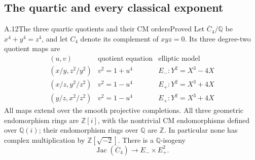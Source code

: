 \subsection{The quartic and every classical exponent}

\begin{statement}{A.12}{The three quartic quotients and their CM orders}{Proved}
Let $\overline C_4/\mathbb Q$ be $x^4+y^4=z^4$, and let $C_4$ denote
its complement of $xyz=0$. Its three degree-two quotient maps are
\[
 \begin{array}{c|c|c}
 (u,v)&\text{quotient equation}&\text{elliptic model}\\\hline
 (x/y,z^2/y^2)&v^2=1+u^4&E_-:Y^2=X^3-4X\\
 (x/z,y^2/z^2)&v^2=1-u^4&E_+:Y^2=X^3+4X\\
 (y/z,x^2/z^2)&v^2=1-u^4&E_+:Y^2=X^3+4X
 \end{array}
\]
All maps extend over the smooth projective completions. All three
geometric endomorphism rings are $\mathbb Z[i]$, with the nontrivial CM
endomorphisms defined over $\mathbb Q(i)$; their endomorphism rings over
$\mathbb Q$ are $\mathbb Z$. In particular none has complex
multiplication by $\mathbb Z[\sqrt{-2}]$. There is a $\mathbb Q$-isogeny
\[
 \operatorname{Jac}(\overline C_4)\longrightarrow E_-\times E_+^2.
\]
\end{statement}

